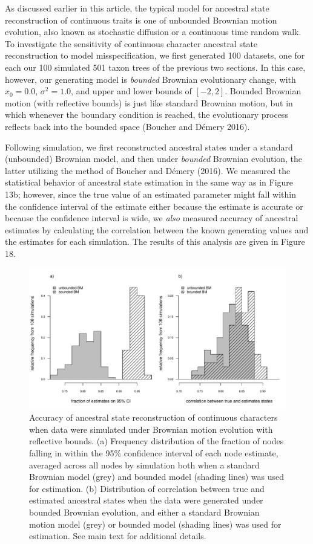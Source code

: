 \documentclass{article}
\begin{document}
As discussed earlier in this article, the typical model for ancestral state reconstruction of continuous traits is one of unbounded Brownian motion evolution, also known as stochastic diffusion or a continuous time random walk. To investigate the sensitivity of continuous character ancestral state reconstruction to model misspecification, we first generated 100 datasets, one for each our 100 simulated 501 taxon trees of the previous two sections. In this case, however, our generating model is \emph{bounded} Brownian evolutionary change, with \(x_0 = 0.0\), \(\sigma^2 = 1.0\), and upper and lower bounds of \([-2, 2]\). Bounded Brownian motion (with reflective bounds) is just like standard Brownian motion, but in which whenever the boundary condition is reached, the evolutionary process reflects back into the bounded space (Boucher and Démery 2016).

Following simulation, we first reconstructed ancestral states under a standard (unbounded) Brownian model, and then under \emph{bounded} Brownian evolution, the latter utilizing the method of Boucher and Démery (2016). We measured the statistical behavior of ancestral state estimation in the same way as in Figure 13b; however, since the true value of an estimated parameter might fall within the confidence interval of the estimate either because the estimate is accurate or because the confidence interval is wide, we \emph{also} measured accuracy of ancestral estimates by calculating the correlation between the known generating values and the estimates for each simulation. The results of this analysis are given in Figure 18.

\begin{figure}
\includegraphics[width=1\linewidth]{Revell.AncestralReconstruction_files/figure-latex/fig18-1} \caption{Accuracy of ancestral state reconstruction of  continuous characters when data were simulated under Brownian motion evolution with reflective bounds. (a) Frequency distribution of the fraction of nodes falling in within the 95\% confidence interval of each node estimate, averaged across all nodes by simulation both when a standard Brownian model (grey) and bounded model (shading lines) was used for estimation. (b) Distribution of correlation between true and estimated ancestral states when the data were generated under bounded Brownian evolution, and either a standard Brownian motion model (grey) or bounded model (shading lines) was used for estimation. See main text for additional details.}\label{fig:fig18}
\end{figure}
\end{document}

